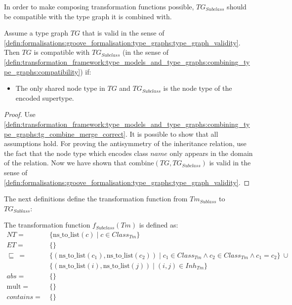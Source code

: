 In order to make composing transformation functions possible, $TG_{Subclass}$ should be compatible with the type graph it is combined with.

\begin{thm}
\label{defin:library_of_transformations:type_level_transformations:regular_subclasses:tg_subclass_as_node_type_combine_correct}
Assume a type graph $TG$ that is valid in the sense of \cref{defin:formalisations:groove_formalisation:type_graphs:type_graph_validity}. Then $TG$ is compatible with $TG_{Subclass}$ (in the sense of \cref{defin:transformation_framework:type_models_and_type_graphs:combining_type_graphs:compatibility}) if:
\begin{itemize}
    \item The only shared node type in $TG$ and $TG_{Subclass}$ is the node type of the encoded supertype.
\end{itemize}
\end{thm}

\begin{proof}
Use \cref{defin:transformation_framework:type_models_and_type_graphs:combining_type_graphs:tg_combine_merge_correct}. It is possible to show that all assumptions hold. For proving the antisymmetry of the inheritance relation, use the fact that the node type which encodes class $name$ only appears in the domain of the relation. Now we have shown that $\mathrm{combine}(TG, TG_{Subclass})$ is valid in the sense of \cref{defin:formalisations:groove_formalisation:type_graphs:type_graph_validity}.
\end{proof}

The next definitions define the transformation function from $Tm_{Sublass}$ to $TG_{Sublass}$:

\begin{defin}
\label{defin:library_of_transformations:type_level_transformations:regular_subclasses:tmod_subclass_to_tg_subclass_as_node_type}
The transformation function $f_{Subclass}(Tm)$ is defined as:
\begin{align*}
NT =\ &\{\mathrm{ns\_\!to\_\!list}(c) \mid c \in Class_{Tm}\} \\
ET =\ &\{\} \\
\!\!\sqsubseteq\ =\ &\{(\mathrm{ns\_\!to\_\!list}(c_1), \mathrm{ns\_\!to\_\!list}(c_2)) \mid c_1 \in Class_{Tm} \land c_2 \in Class_{Tm} \land c_1 = c_2 \}\ \cup \\&
\{(\mathrm{ns\_\!to\_\!list}(i), \mathrm{ns\_\!to\_\!list}(j)) \mid (i, j) \in Inh_{Tm} \} \\
abs =\ &\{\} \\
\mathrm{mult} =\ &\{\} \\
contains =\ &\{\}
\end{align*}
\end{defin}

